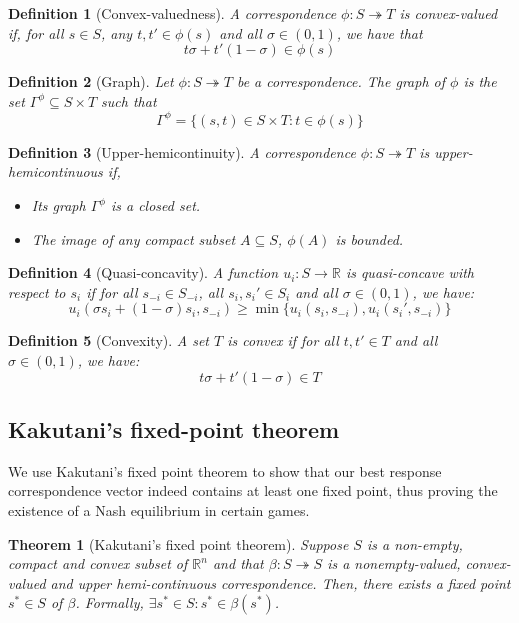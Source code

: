 \documentclass[12pt]{report}
\newtheorem{theorem}{Theorem}[chapter]
\newtheorem{definition}{Definition}[chapter]
\begin{document}
\begin{definition}[Convex-valuedness]
A correspondence $\phi:S\twoheadrightarrow T$ is convex-valued if, for all $s\in S$, any $t,t'\in \phi(s)$ and all $\sigma\in(0,1)$, we have that $$t\sigma + t'(1-\sigma) \in \phi(s)$$
\end{definition}

\begin{definition}[Graph]
Let $\phi:S\twoheadrightarrow T$ be a correspondence. The graph of $\phi$ is the set $\Gamma^\phi \subseteq S\times T$ such that $$\Gamma^\phi = \{(s,t)\in S\times T : t\in\phi(s)\} $$
\end{definition}

\begin{definition}[Upper-hemicontinuity]
A correspondence $\phi:S\twoheadrightarrow T$ is upper-hemicontinuous if, \begin{itemize}
\item[(i)] Its graph $\Gamma^\phi$ is a closed set.
\item[(ii)] The image of any compact subset $A\subseteq S$, $\phi(A)$ is bounded.
\end{itemize} 
\end{definition}

\begin{definition}[Quasi-concavity]
A function $u_i:S\to \mathbb{R}$ is quasi-concave with respect to $s_i$ if for all $s_{-i}\in S_{-i}$, all $s_i, s_i'\in S_i$ and all $\sigma\in (0,1)$, we have: $$u_i(\sigma s_i + (1- \sigma)s_i, s_{-i})\geq \min\{u_i(s_i,s_{-i}),u_i(s_i',s_{-i})\}$$
\end{definition}

\begin{definition}[Convexity]
A set $T$ is convex if for all $t,t'\in T$ and all $\sigma\in (0,1)$, we have:$$t\sigma + t'(1 - \sigma)\in T$$ 
\end{definition}

\subsection{Kakutani's fixed-point theorem}

We use Kakutani's fixed point theorem to show that our best response correspondence vector indeed contains at least one fixed point, thus proving the existence of a Nash equilibrium in certain games.

\begin{theorem}[Kakutani's fixed point theorem]
Suppose $S$ is a non-empty, compact and convex subset of $\mathbb{R}^n$ and that $\beta:S\twoheadrightarrow S$ is a nonempty-valued, convex-valued and upper hemi-continuous correspondence. Then, there exists a fixed point $s^*\in S$ of $\beta$. Formally, $\exists s^*\in S : s^* \in \beta(s^*)$.
\end{theorem}
\end{document}
